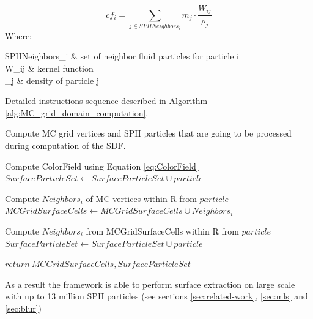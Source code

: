 \begin{equation} \label{eq:ColorField}
	cf_i = \sum_{j\in SPHNeighbors_i}{m_j \cdot \dfrac{W_{ij}}{\rho_j}}
\end{equation}
Where:
\begin{conditions}
	SPHNeighbors_i & set of neighbor fluid particles for particle i\\
	W_{ij} & kernel function\\
	\rho_j & density of particle j\\
\end{conditions}
Detailed instructions sequence described in Algorithm \ref{alg:MC_grid_domain_computation}.
\begin{algorithm}
	\scriptsize
	\caption{Compute MC grid vertices and SPH particles that are going to be processed during computation of the SDF.}
	\label{alg:MC_grid_domain_computation}
	\begin{algorithmic}
			\State Compute ColorField using Equation \ref{eq:ColorField}
				\State $SurfaceParticleSet \gets SurfaceParticleSet \cup particle$
			\EndIf
		\EndFor

			\State Compute $Neighbors_i$ of MC vertices within R from  $particle$
			\State $MCGridSurfaceCells \gets MCGridSurfaceCells \cup Neighbors_i$
		\EndFor

			\State Compute $Neighbors_i$ from MCGridSurfaceCells within R from  $particle$
				\State $SurfaceParticleSet \gets SurfaceParticleSet \cup particle$
			\EndIf
		\EndFor

		\State $return\ MCGridSurfaceCells, SurfaceParticleSet$
	\end{algorithmic}
\end{algorithm}

As a result the framework is able to perform surface extraction on large scale with up to 13 million SPH particles (see sections \ref{sec:related-work}, \ref{sec:mls} and \ref{sec:blur})
